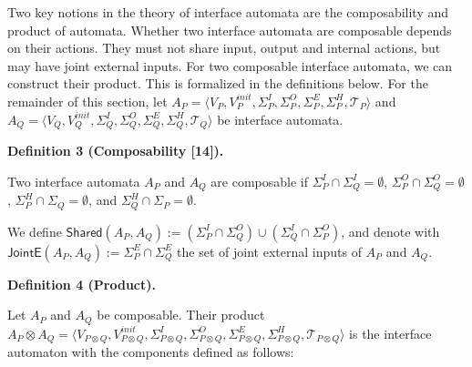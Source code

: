  
 
Two key notions in the theory of interface automata are the composability and product of automata. Whether two interface automata are composable depends on their actions. They must not share input, output and internal actions, but may have joint external inputs. For two composable interface automata, we can construct their product. This is formalized in the definitions below. For the remainder of this section, let $A_{P}=\langle V_{P},V_{P}^{init},\Sigma_{P}^{I},\Sigma_{P}^{O},\Sigma_{P}^{E},\Sigma_{P}^{H},\mathcal{T}_{P}\rangle$ and $A_{Q}=\langle V_{Q},V_{Q}^{init},\Sigma_{Q}^{I},\Sigma_{Q}^{O},\Sigma_{Q}^{E},\Sigma_{Q}^{H},\mathcal{T}_{Q}\rangle$ be interface automata.\par
 
 
 
\par\medskip\noindent\textbf{Definition 3 (Composability [14]).}\par
 
 
Two interface automata $A_{P}$ and $A_{Q}$ are composable if $\Sigma_{P}^{I}\cap\Sigma_{Q}^{I}=\emptyset$, $\Sigma_{P}^{O}\cap\Sigma_{Q}^{O}=\emptyset$, $\Sigma_{P}^{H}\cap\Sigma_{Q}=\emptyset$, and $\Sigma_{Q}^{H}\cap\Sigma_{P}=\emptyset$.\par
 
 
 
We define $\mathsf{Shared}(A_{P},A_{Q}):=(\Sigma_{P}^{I}\cap\Sigma_{Q}^{O})\cup(\Sigma_{Q}^{I}\cap\Sigma_{P}^{O})$, and denote with $\mathsf{JointE}(A_{P},A_{Q}):=\Sigma_{P}^{E}\cap\Sigma_{Q}^{E}$ the set of joint external inputs of $A_{P}$ and $A_{Q}$.\par
 
 
 
 
\par\medskip\noindent\textbf{Definition 4 (Product).}\par
 
 
Let $A_{P}$ and $A_{Q}$ be composable. Their product $A_{P}\otimes A_{Q}=\langle V_{P\otimes Q},V_{P\otimes Q}^{init},\Sigma_{P\otimes Q}^{I},\Sigma_{P\otimes Q}^{O},\Sigma_{P\otimes Q}^{E},\Sigma_{P\otimes Q}^{H},\mathcal{T}_{P\otimes Q}\rangle$ is the interface automaton with the components defined as follows:\par
  
